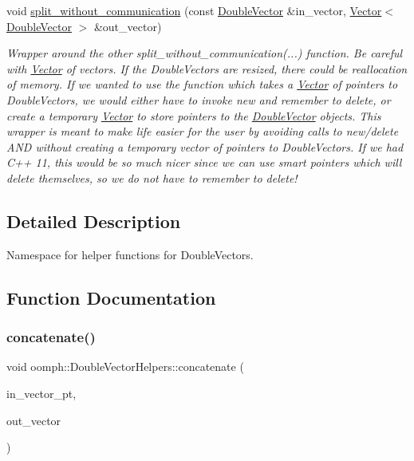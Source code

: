 \begin{DoxyCompactItemize}
void \hyperlink{namespaceoomph_1_1DoubleVectorHelpers_a66afcc493558424fb89f26bc23dd5bf2}{split\+\_\+without\+\_\+communication} (const \hyperlink{classoomph_1_1DoubleVector}{Double\+Vector} \&in\+\_\+vector, \hyperlink{classoomph_1_1Vector}{Vector}$<$ \hyperlink{classoomph_1_1DoubleVector}{Double\+Vector} $>$ \&out\+\_\+vector)
\begin{DoxyCompactList}\small\item\em Wrapper around the other split\+\_\+without\+\_\+communication(...) function. Be careful with \hyperlink{classoomph_1_1Vector}{Vector} of vectors. If the Double\+Vectors are resized, there could be reallocation of memory. If we wanted to use the function which takes a \hyperlink{classoomph_1_1Vector}{Vector} of pointers to Double\+Vectors, we would either have to invoke new and remember to delete, or create a temporary \hyperlink{classoomph_1_1Vector}{Vector} to store pointers to the \hyperlink{classoomph_1_1DoubleVector}{Double\+Vector} objects. This wrapper is meant to make life easier for the user by avoiding calls to new/delete A\+ND without creating a temporary vector of pointers to Double\+Vectors. If we had C++ 11, this would be so much nicer since we can use smart pointers which will delete themselves, so we do not have to remember to delete! \end{DoxyCompactList}\end{DoxyCompactItemize}


\subsection{Detailed Description}
Namespace for helper functions for Double\+Vectors. 

\subsection{Function Documentation}
\mbox{\label{namespaceoomph_1_1DoubleVectorHelpers_ae5259ed3ae48ad417c743de0166884f8}} 
\subsubsection{\texorpdfstring{concatenate()}{concatenate()}\hspace{0.1cm}{\footnotesize\ttfamily [1/2]}}
{\footnotesize\ttfamily void oomph\+::\+Double\+Vector\+Helpers\+::concatenate (\begin{DoxyParamCaption}\item[{const \hyperlink{classoomph_1_1Vector}{Vector}$<$ \hyperlink{classoomph_1_1DoubleVector}{Double\+Vector} $\ast$$>$ \&}]{in\+\_\+vector\+\_\+pt,  }\item[{\hyperlink{classoomph_1_1DoubleVector}{Double\+Vector} \&}]{out\+\_\+vector }\end{DoxyParamCaption})}



